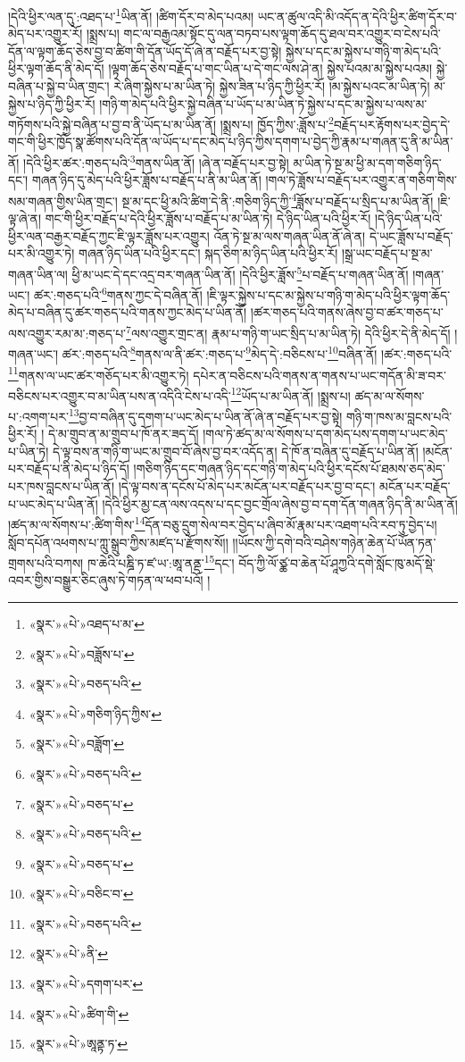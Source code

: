 །དེའི་ཕྱིར་ལན་དུ་:འཐད་པ་\footnote{«སྣར་»«པེ་»འཐད་པ་མ་}ཡིན་ནོ། །ཚིག་དོར་བ་མེད་པའམ། ཡང་ན་ཚུལ་འདི་མི་འདོད་ན་དེའི་ཕྱིར་ཚིག་དོར་བ་མེད་པར་འགྱུར་རོ། །སྨྲས་པ། གང་ལ་བརྒྱའམ་སྟོང་དུ་ལན་བཏབ་པས་ལྟག་ཆོད་དུ་ཐལ་བར་འགྱུར་བ་ངེས་པའི་དོན་ལ་ལྟག་ཆོད་ཅེས་བྱ་བ་ཚིག་གི་དོན་ཡོད་དོ་ཞེ་ན་བརྗོད་པར་བྱ་སྟེ། སྐྱེས་པ་དང་མ་སྐྱེས་པ་གཉི་ག་མེད་པའི་ཕྱིར་ལྟག་ཆོད་ནི་མེད་དོ། །ལྟག་ཆོད་ཅེས་བརྗོད་པ་གང་ཡིན་པ་དེ་གང་ལས་ཤེ་ན། སྐྱེས་པའམ་མ་སྐྱེས་པའམ། སྐྱེ་བཞིན་པ་སྐྱེ་བ་ཡིན་གྲང་། རེ་ཞིག་སྐྱེས་པ་མ་ཡིན་ཏེ། སྐྱེས་ཟིན་པ་ཉིད་ཀྱི་ཕྱིར་རོ། །མ་སྐྱེས་པའང་མ་ཡིན་ཏེ། མ་སྐྱེས་པ་ཉིད་ཀྱི་ཕྱིར་རོ། །གཉི་ག་མེད་པའི་ཕྱིར་སྐྱེ་བཞིན་པ་ཡོད་པ་མ་ཡིན་ཏེ་སྐྱེས་པ་དང་མ་སྐྱེས་པ་ལས་མ་གཏོགས་པའི་སྐྱེ་བཞིན་པ་བྱ་བ་ནི་ཡོད་པ་མ་ཡིན་ནོ། །སྨྲས་པ། ཁྱོད་ཀྱིས་:ཟློས་པ་\footnote{«སྣར་»«པེ་»བཟློས་པ་}བརྗོད་པར་རྟོགས་པར་བྱེད་དེ་གང་གི་ཕྱིར་ཁྱོད་སྣ་ཚོགས་པའི་དོན་ལ་ཡོད་པ་དང་མེད་པ་ཉིད་ཀྱིས་དགག་པ་བྱེད་ཀྱི་རྣམ་པ་གཞན་དུ་ནི་མ་ཡིན་ནོ། །དེའི་ཕྱིར་ཚར་:གཅད་པའི་\footnote{«སྣར་»«པེ་»བཅད་པའི་}གནས་ཡིན་ནོ། །ཞེ་ན་བརྗོད་པར་བྱ་སྟེ། མ་ཡིན་ཏེ་སྔ་མ་ཕྱི་མ་དག་གཅིག་ཉིད་དང་། གཞན་ཉིད་དུ་མེད་པའི་ཕྱིར་ཟློས་པ་བརྗོད་པ་ནི་མ་ཡིན་ནོ། །གལ་ཏེ་ཟློས་པ་བརྗོད་པར་འགྱུར་ན་གཅིག་གིས་སམ་གཞན་གྱིས་ཡིན་གྲང་། སྔ་མ་དང་ཕྱི་མའི་ཚིག་དེ་ནི་:གཅིག་ཉིད་ཀྱི་\footnote{«སྣར་»«པེ་»གཅིག་ཉིད་ཀྱིས་}ཟློས་པ་བརྗོད་པ་སྲིད་པ་མ་ཡིན་ནོ། །ཇི་ལྟ་ཞེ་ན། གང་གི་ཕྱིར་བརྗོད་པ་དེའི་ཕྱིར་ཟློས་པ་བརྗོད་པ་མ་ཡིན་ཏེ། དེ་ཉིད་ཡིན་པའི་ཕྱིར་རོ། །དེ་ཉིད་ཡིན་པའི་ཕྱིར་ལན་བརྒྱར་བརྗོད་ཀྱང་ཇི་ལྟར་ཟློས་པར་འགྱུར། འོན་ཏེ་སྔ་མ་ལས་གཞན་ཡིན་ནོ་ཞེ་ན། དེ་ཡང་ཟློས་པ་བརྗོད་པར་མི་འགྱུར་ཏེ། གཞན་ཉིད་ཡིན་པའི་ཕྱིར་དང་། སྐད་ཅིག་མ་ཉིད་ཡིན་པའི་ཕྱིར་རོ། །སྒྲ་ཡང་བརྗོད་པ་སྔ་མ་གཞན་ཡིན་ལ། ཕྱི་མ་ཡང་དེ་དང་འདྲ་བར་གཞན་ཡིན་ནོ། །དེའི་ཕྱིར་ཟློས་\footnote{«སྣར་»«པེ་»བཟློག་}པ་བརྗོད་པ་གཞན་ཡིན་ནོ། །གཞན་ཡང་། ཚར་:གཅད་པའི་\footnote{«སྣར་»«པེ་»བཅད་པའི་}གནས་ཀྱང་དེ་བཞིན་ནོ། །ཇི་ལྟར་སྐྱེས་པ་དང་མ་སྐྱེས་པ་གཉི་ག་མེད་པའི་ཕྱིར་ལྟག་ཆོད་མེད་པ་བཞིན་དུ་ཚར་གཅད་པའི་གནས་ཀྱང་མེད་པ་ཡིན་ནོ། །ཚར་གཅད་པའི་གནས་ཞེས་བྱ་བ་ཚར་གཅད་པ་ལས་འགྱུར་རམ་མ་:གཅད་པ་\footnote{«སྣར་»«པེ་»བཅད་པ་}ལས་འགྱུར་གྲང་ན། རྣམ་པ་གཉི་ག་ཡང་སྲིད་པ་མ་ཡིན་ཏེ། དེའི་ཕྱིར་དེ་ནི་མེད་དོ། །གཞན་ཡང་། ཚར་:གཅད་པའི་\footnote{«སྣར་»«པེ་»བཅད་པའི་}གནས་ལ་ནི་ཚར་:གཅད་པ་\footnote{«སྣར་»«པེ་»བཅད་པ་}མེད་དེ་:བཅིངས་པ་\footnote{«སྣར་»«པེ་»བཅིང་བ་}བཞིན་ནོ། །ཚར་:གཅད་པའི་\footnote{«སྣར་»«པེ་»བཅད་པའི་}གནས་ལ་ཡང་ཚར་གཅོད་པར་མི་འགྱུར་ཏེ། དཔེར་ན་བཅིངས་པའི་གནས་ན་གནས་པ་ཡང་གདོན་མི་ཟ་བར་བཅིངས་པར་འགྱུར་བ་མ་ཡིན་པས་ན་འདིའི་ངེས་པ་འདི་\footnote{«སྣར་»«པེ་»ནི་}ཡོད་པ་མ་ཡིན་ནོ། །སྨྲས་པ། ཚད་མ་ལ་སོགས་པ་:འགག་པར་\footnote{«སྣར་»«པེ་»དགག་པར་}བྱ་བ་བཞིན་དུ་དགག་པ་ཡང་མེད་པ་ཡིན་ནོ་ཞེ་ན་བརྗོད་པར་བྱ་སྟེ། གཉི་ག་ཁས་མ་བླངས་པའི་ཕྱིར་རོ། །
དེ་མ་གྲུབ་ན་མ་གྲུབ་པ་ཁོ་ནར་ཟད་དོ། །གལ་ཏེ་ཚད་མ་ལ་སོགས་པ་དག་མེད་པས་དགག་པ་ཡང་མེད་པ་ཡིན་ཏེ། དེ་ལྟ་བས་ན་གཉི་ག་ཡང་མ་གྲུབ་བོ་ཞེས་བྱ་བར་འདོད་ན། དེ་ཁོ་ན་བཞིན་དུ་བརྗོད་པ་ཡིན་ནོ། །མངོན་པར་བརྗོད་པ་ནི་མེད་པ་ཉིད་དོ། །གཅིག་ཉིད་དང་གཞན་ཉིད་དང་གཉི་ག་མེད་པའི་ཕྱིར་དངོས་པོ་ཐམས་ཅད་མེད་པར་ཁས་བླངས་པ་ཡིན་ནོ། །དེ་ལྟ་བས་ན་དངོས་པོ་མེད་པར་མངོན་པར་བརྗོད་པར་བྱ་བ་དང་། མངོན་པར་བརྗོད་པ་ཡང་མེད་པ་ཡིན་ནོ། །དེའི་ཕྱིར་མྱ་ངན་ལས་འདས་པ་དང་བྱང་གྲོལ་ཞེས་བྱ་བ་དག་དོན་གཞན་ཉིད་ནི་མ་ཡིན་ནོ། །ཚད་མ་ལ་སོགས་པ་:ཚིག་གིས་\footnote{«སྣར་»«པེ་»ཚིག་གི་}དོན་བཅུ་དྲུག་སེལ་བར་བྱེད་པ་ཞིབ་མོ་རྣམ་པར་འཐག་པའི་རབ་ཏུ་བྱེད་པ། སློབ་དཔོན་འཕགས་པ་ཀླུ་སྒྲུབ་ཀྱིས་མཛད་པ་རྫོགས་སོ།། །།ཡོངས་ཀྱི་དགེ་བའི་བཤེས་གཉེན་ཆེན་པོ་ཡོན་ཏན་གྲགས་པའི་བཀས། ཁ་ཆེའི་པཎྜི་ཏ་ཛ་ཡ་:ཨཱ་ནནྡ་\footnote{«སྣར་»«པེ་»ཨཱནྟ་ཏ་}དང་། བོད་ཀྱི་ལོ་ཙྪ་བ་ཆེན་པོ་ཤཱཀྱའི་དགེ་སློང་ཁུ་མདོ་སྡེ་འབར་གྱིས་བསྒྱུར་ཅིང་ཞུས་ཏེ་གཏན་ལ་ཕབ་པའོ། ། 